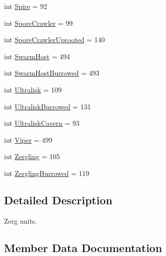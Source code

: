 \begin{DoxyCompactItemize}
int \mbox{\hyperlink{classpysc2_1_1lib_1_1units_1_1_zerg_a055222e14ec0946586b39d76e0aa4292}{Spire}} = 92
\item 
int \mbox{\hyperlink{classpysc2_1_1lib_1_1units_1_1_zerg_acce39ae0b61649fe61024fa7e71e00ae}{Spore\+Crawler}} = 99
\item 
int \mbox{\hyperlink{classpysc2_1_1lib_1_1units_1_1_zerg_a94cc5e6e38e6bf7c658201a2160af21b}{Spore\+Crawler\+Uprooted}} = 140
\item 
int \mbox{\hyperlink{classpysc2_1_1lib_1_1units_1_1_zerg_a8b91fff7b7659b25aab2fd2f7a4ff38c}{Swarm\+Host}} = 494
\item 
int \mbox{\hyperlink{classpysc2_1_1lib_1_1units_1_1_zerg_a42dff112ae30a65abd0cc4d3d1af8e35}{Swarm\+Host\+Burrowed}} = 493
\item 
int \mbox{\hyperlink{classpysc2_1_1lib_1_1units_1_1_zerg_a7d7d4f33b5062abdc8d887b734d43530}{Ultralisk}} = 109
\item 
int \mbox{\hyperlink{classpysc2_1_1lib_1_1units_1_1_zerg_a5e3b090b5dee90f9949641d043954f2b}{Ultralisk\+Burrowed}} = 131
\item 
int \mbox{\hyperlink{classpysc2_1_1lib_1_1units_1_1_zerg_ad91fc2bf07f7ae601986b3f8d6d9c3bd}{Ultralisk\+Cavern}} = 93
\item 
int \mbox{\hyperlink{classpysc2_1_1lib_1_1units_1_1_zerg_ac6f0b27347c34cea4bc402d5793d45ff}{Viper}} = 499
\item 
int \mbox{\hyperlink{classpysc2_1_1lib_1_1units_1_1_zerg_a166d9f0a450a0ba8732a9cfe5b44cd28}{Zergling}} = 105
\item 
int \mbox{\hyperlink{classpysc2_1_1lib_1_1units_1_1_zerg_ada32875f4c8fb75d4830b0e62224b38f}{Zergling\+Burrowed}} = 119
\end{DoxyCompactItemize}


\subsection{Detailed Description}
\begin{DoxyVerb}Zerg units.\end{DoxyVerb}
 

\subsection{Member Data Documentation}
\mbox{\label{classpysc2_1_1lib_1_1units_1_1_zerg_ade29bf7d493896c18340d2404263cba8}} 
